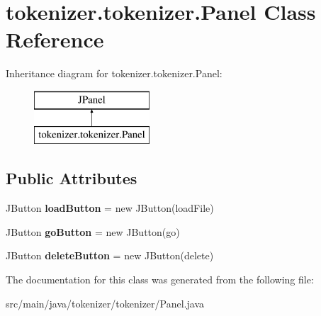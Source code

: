 \hypertarget{classtokenizer_1_1tokenizer_1_1_panel}{}\section{tokenizer.\+tokenizer.\+Panel Class Reference}
\label{classtokenizer_1_1tokenizer_1_1_panel}
Inheritance diagram for tokenizer.\+tokenizer.\+Panel\+:\begin{figure}[H]
\begin{center}
\leavevmode
\includegraphics[height=2.000000cm]{classtokenizer_1_1tokenizer_1_1_panel}
\end{center}
\end{figure}
\subsection*{Public Attributes}
\begin{DoxyCompactItemize}
\item 
\hypertarget{classtokenizer_1_1tokenizer_1_1_panel_a02478f6b50abf2c065f425d5a8d1f0a2}{}J\+Button {\bfseries load\+Button} = new J\+Button(load\+File)\label{classtokenizer_1_1tokenizer_1_1_panel_a02478f6b50abf2c065f425d5a8d1f0a2}

\item 
\hypertarget{classtokenizer_1_1tokenizer_1_1_panel_a8d0d8b60a433bacb5033744ab95fd29b}{}J\+Button {\bfseries go\+Button} = new J\+Button(go)\label{classtokenizer_1_1tokenizer_1_1_panel_a8d0d8b60a433bacb5033744ab95fd29b}

\item 
\hypertarget{classtokenizer_1_1tokenizer_1_1_panel_aa295c5f118634fa54028f6209d76403c}{}J\+Button {\bfseries delete\+Button} = new J\+Button(delete)\label{classtokenizer_1_1tokenizer_1_1_panel_aa295c5f118634fa54028f6209d76403c}

\end{DoxyCompactItemize}


The documentation for this class was generated from the following file\+:\begin{DoxyCompactItemize}
\item 
src/main/java/tokenizer/tokenizer/Panel.\+java\end{DoxyCompactItemize}
